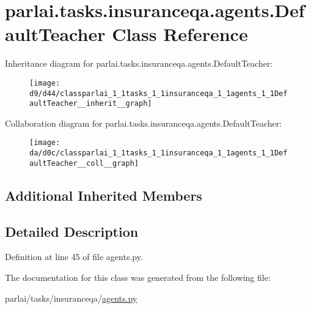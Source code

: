 \hypertarget{classparlai_1_1tasks_1_1insuranceqa_1_1agents_1_1DefaultTeacher}{}\section{parlai.\+tasks.\+insuranceqa.\+agents.\+Default\+Teacher Class Reference}
\label{classparlai_1_1tasks_1_1insuranceqa_1_1agents_1_1DefaultTeacher}


Inheritance diagram for parlai.\+tasks.\+insuranceqa.\+agents.\+Default\+Teacher\+:\nopagebreak
\begin{figure}[H]
\begin{center}
\leavevmode
\texttt{[image: d9/d44/classparlai\_1\_1tasks\_1\_1insuranceqa\_1\_1agents\_1\_1DefaultTeacher\_\_inherit\_\_graph]}
\end{center}
\end{figure}


Collaboration diagram for parlai.\+tasks.\+insuranceqa.\+agents.\+Default\+Teacher\+:\nopagebreak
\begin{figure}[H]
\begin{center}
\leavevmode
\texttt{[image: da/d0c/classparlai\_1\_1tasks\_1\_1insuranceqa\_1\_1agents\_1\_1DefaultTeacher\_\_coll\_\_graph]}
\end{center}
\end{figure}
\subsection*{Additional Inherited Members}


\subsection{Detailed Description}


Definition at line 45 of file agents.\+py.



The documentation for this class was generated from the following file\+:\begin{DoxyCompactItemize}
\item 
parlai/tasks/insuranceqa/\hyperlink{parlai_2tasks_2insuranceqa_2agents_8py}{agents.\+py}\end{DoxyCompactItemize}
